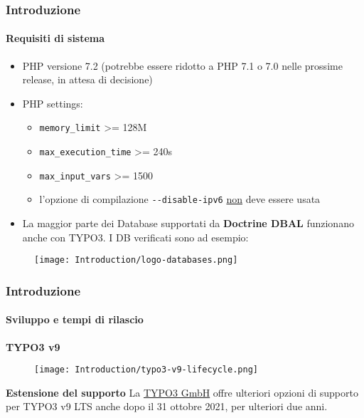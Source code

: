 \begin{frame}[fragile]
	\frametitle{Introduzione}
	\framesubtitle{Requisiti di sistema}

	\begin{itemize}
		\item PHP versione 7.2\newline
			\smaller
				(potrebbe essere ridotto a PHP 7.1 o 7.0 nelle prossime release, in attesa di decisione)
			\normalsize

		\item PHP settings:

			\begin{itemize}
				\item \texttt{memory\_limit} >= 128M
				\item \texttt{max\_execution\_time} >= 240s
				\item \texttt{max\_input\_vars} >= 1500
				\item l'opzione di compilazione \texttt{-}\texttt{-disable-ipv6} \underline{non} deve essere usata
			\end{itemize}

		\item La maggior parte dei Database supportati da \textbf{Doctrine DBAL} funzionano anche con TYPO3.
			I DB verificati sono ad esempio:
	\end{itemize}

	\begin{figure}
		\texttt{[image: Introduction/logo-databases.png]}
	\end{figure}

\end{frame}

\begin{frame}[fragile]
	\frametitle{Introduzione}
	\framesubtitle{Sviluppo e tempi di rilascio}

	\textbf{TYPO3 v9}

	\begin{figure}
		\texttt{[image: Introduction/typo3-v9-lifecycle.png]}
	\end{figure}

	\textbf{Estensione del supporto}\newline
	\smaller
		La \href{https://typo3.com}{TYPO3 GmbH} offre ulteriori opzioni di supporto
		per TYPO3 v9 LTS anche dopo il 31 ottobre 2021, per ulteriori due anni.
	\normalsize


\end{frame}

